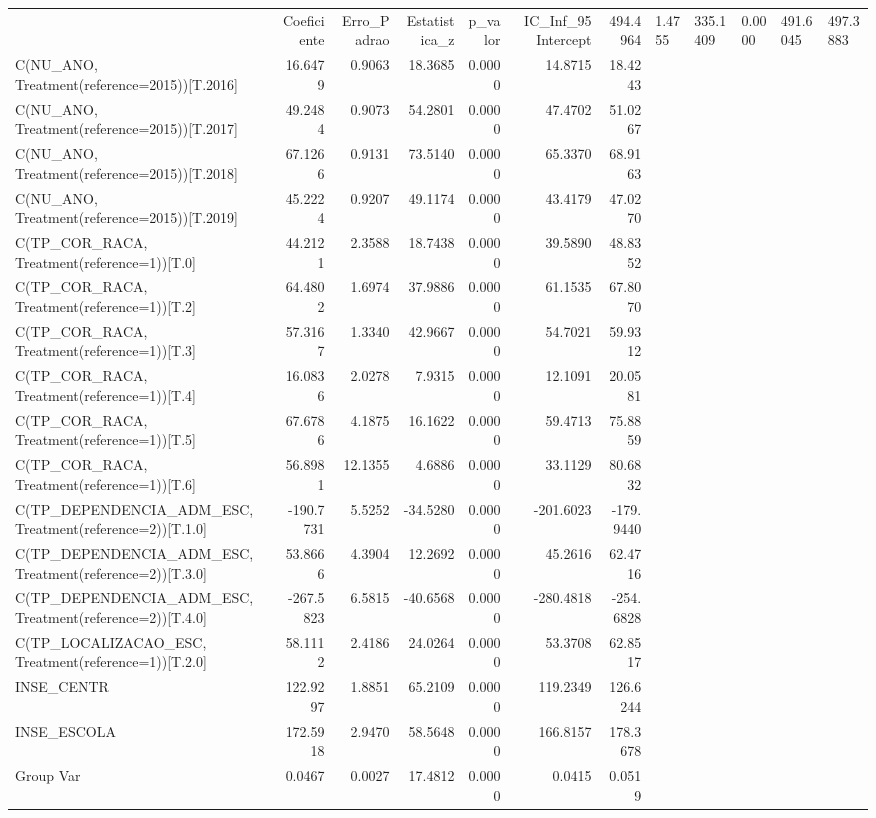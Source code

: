\begin{tabular}{lrrrrrr}
\toprule
 & Coeficiente & Erro_Padrao & Estatistica_z & p_valor & IC_Inf_95%
\midrule
Intercept & 494.4964 & 1.4755 & 335.1409 & 0.0000 & 491.6045 & 497.3883 \\
C(NU_ANO, Treatment(reference=2015))[T.2016] & 16.6479 & 0.9063 & 18.3685 & 0.0000 & 14.8715 & 18.4243 \\
C(NU_ANO, Treatment(reference=2015))[T.2017] & 49.2484 & 0.9073 & 54.2801 & 0.0000 & 47.4702 & 51.0267 \\
C(NU_ANO, Treatment(reference=2015))[T.2018] & 67.1266 & 0.9131 & 73.5140 & 0.0000 & 65.3370 & 68.9163 \\
C(NU_ANO, Treatment(reference=2015))[T.2019] & 45.2224 & 0.9207 & 49.1174 & 0.0000 & 43.4179 & 47.0270 \\
C(TP_COR_RACA, Treatment(reference=1))[T.0] & 44.2121 & 2.3588 & 18.7438 & 0.0000 & 39.5890 & 48.8352 \\
C(TP_COR_RACA, Treatment(reference=1))[T.2] & 64.4802 & 1.6974 & 37.9886 & 0.0000 & 61.1535 & 67.8070 \\
C(TP_COR_RACA, Treatment(reference=1))[T.3] & 57.3167 & 1.3340 & 42.9667 & 0.0000 & 54.7021 & 59.9312 \\
C(TP_COR_RACA, Treatment(reference=1))[T.4] & 16.0836 & 2.0278 & 7.9315 & 0.0000 & 12.1091 & 20.0581 \\
C(TP_COR_RACA, Treatment(reference=1))[T.5] & 67.6786 & 4.1875 & 16.1622 & 0.0000 & 59.4713 & 75.8859 \\
C(TP_COR_RACA, Treatment(reference=1))[T.6] & 56.8981 & 12.1355 & 4.6886 & 0.0000 & 33.1129 & 80.6832 \\
C(TP_DEPENDENCIA_ADM_ESC, Treatment(reference=2))[T.1.0] & -190.7731 & 5.5252 & -34.5280 & 0.0000 & -201.6023 & -179.9440 \\
C(TP_DEPENDENCIA_ADM_ESC, Treatment(reference=2))[T.3.0] & 53.8666 & 4.3904 & 12.2692 & 0.0000 & 45.2616 & 62.4716 \\
C(TP_DEPENDENCIA_ADM_ESC, Treatment(reference=2))[T.4.0] & -267.5823 & 6.5815 & -40.6568 & 0.0000 & -280.4818 & -254.6828 \\
C(TP_LOCALIZACAO_ESC, Treatment(reference=1))[T.2.0] & 58.1112 & 2.4186 & 24.0264 & 0.0000 & 53.3708 & 62.8517 \\
INSE_CENTR & 122.9297 & 1.8851 & 65.2109 & 0.0000 & 119.2349 & 126.6244 \\
INSE_ESCOLA & 172.5918 & 2.9470 & 58.5648 & 0.0000 & 166.8157 & 178.3678 \\
Group Var & 0.0467 & 0.0027 & 17.4812 & 0.0000 & 0.0415 & 0.0519 \\
\bottomrule
\end{tabular}
